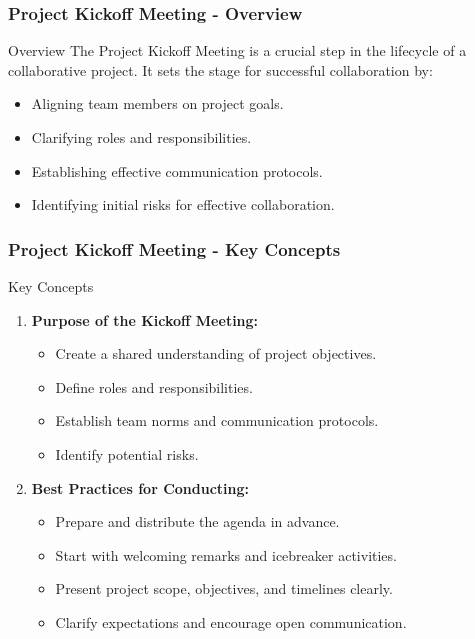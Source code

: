 \documentclass[aspectratio=169]{beamer}
\begin{document}
\begin{frame}[fragile]
    \frametitle{Project Kickoff Meeting - Overview}
    \begin{block}{Overview}
        The Project Kickoff Meeting is a crucial step in the lifecycle of a collaborative project. It sets the stage for successful collaboration by:
    \end{block}
    \begin{itemize}
        \item Aligning team members on project goals.
        \item Clarifying roles and responsibilities.
        \item Establishing effective communication protocols.
        \item Identifying initial risks for effective collaboration.
    \end{itemize}
\end{frame}

\begin{frame}[fragile]
    \frametitle{Project Kickoff Meeting - Key Concepts}
    \begin{block}{Key Concepts}
        \begin{enumerate}
            \item \textbf{Purpose of the Kickoff Meeting:}
            \begin{itemize}
                \item Create a shared understanding of project objectives.
                \item Define roles and responsibilities.
                \item Establish team norms and communication protocols.
                \item Identify potential risks.
            \end{itemize}
            
            \item \textbf{Best Practices for Conducting:}
            \begin{itemize}
                \item Prepare and distribute the agenda in advance.
                \item Start with welcoming remarks and icebreaker activities.
                \item Present project scope, objectives, and timelines clearly.
                \item Clarify expectations and encourage open communication.
            \end{itemize}
        \end{enumerate}
    \end{block}
\end{frame}
\end{document}
